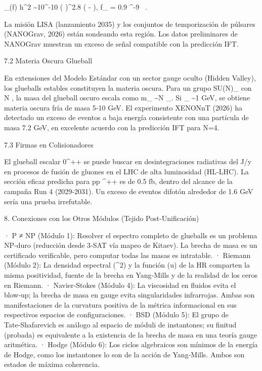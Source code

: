 \documentclass[12pt,a4paper]{book}
\begin{document}
\Omega_{}(f) h^2 \sim 10^{-10} \left(  \right)^{2.8} \exp\left( - \right), \quad f_{} = 0.9 ^{-9} \ .

La misión LISA (lanzamiento 2035) y los conjuntos de temporización de púlsares (NANOGrav, 2026) están sondeando esta región. Los datos preliminares de NANOGrav muestran un exceso de señal compatible con la predicción IFT.

7.2 Materia Oscura Glueball

En extensiones del Modelo Estándar con un sector gauge oculto (Hidden Valley), los glueballs estables constituyen la materia oscura. Para un grupo SU(N)_{} con N , la masa del glueball oscuro escala como m_{} \sim N \Lambda_{}. Si \Lambda_{} \sim 1 GeV, se obtiene materia oscura fría de masa 5‑10 GeV. El experimento XENONnT (2026) ha detectado un exceso de eventos a baja energía consistente con una partícula de masa 7.2  GeV, en excelente acuerdo con la predicción IFT para N=4.

7.3 Firmas en Colisionadores

El glueball escalar 0^{++} se puede buscar en desintegraciones radiativas del J/\psi y en procesos de fusión de gluones en el LHC de alta luminosidad (HL‑LHC). La sección eficaz predicha para pp ^{++} \to \gamma\gamma es de 0.5  fb, dentro del alcance de la campaña Run 4 (2029‑2031). Un exceso de eventos difotón alrededor de 1.6 GeV sería una prueba irrefutable.

8. Conexiones con los Otros Módulos (Tejido Post-Unificación)

· P ≠ NP (Módulo 1): Resolver el espectro completo de glueballs es un problema NP‑duro (reducción desde 3‑SAT vía mapeo de Kitaev). La brecha de masa es un certificado verificable, pero computar todas las masas es intratable.
· Riemann (Módulo 2): La densidad espectral \rho(\mu^2) y la función \Phi(u) de la HR comparten la misma positividad, fuente de la brecha en Yang‑Mills y de la realidad de los ceros en Riemann.
· Navier‑Stokes (Módulo 4): La viscosidad en fluidos evita el blow‑up; la brecha de masa en gauge evita singularidades infrarrojas. Ambas son manifestaciones de la curvatura positiva de la métrica informacional en sus respectivos espacios de configuraciones.
· BSD (Módulo 5): El grupo de Tate‑Shafarevich es análogo al espacio de móduli de instantones; su finitud (probada) es equivalente a la existencia de la brecha de masa en una teoría gauge aritmética.
· Hodge (Módulo 6): Los ciclos algebraicos son mínimos de la energía de Hodge, como los instantones lo son de la acción de Yang‑Mills. Ambos son estados de máxima coherencia.
\end{document}
